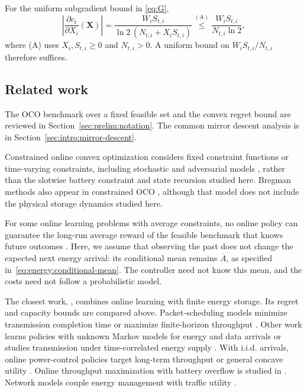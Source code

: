 For the uniform subgradient bound in \eqref{eq:G},
\[
 \left|\frac{\partial c_t}{\partial X_i}(\mathbf X)\right|
 =\frac{W_iS_{t,i}}{\ln 2\,(N_{t,i}+X_iS_{t,i})}
 \overset{\mathrm{(A)}}{\leq}\frac{W_iS_{t,i}}{N_{t,i}\ln 2},
\]
where (A) uses $X_i,S_{t,i}\geq0$ and $N_{t,i}>0$.
A uniform bound on $W_iS_{t,i}/N_{t,i}$ therefore suffices.

\subsection{Related work}

The OCO benchmark over a fixed feasible set and the convex regret bound
are reviewed in Section~\ref{sec:prelim:notation}. The common mirror
descent analysis is in Section~\ref{sec:intro:mirror-descent}.

Constrained online convex optimization considers fixed constraint functions
\cite{mahdavi2012trading,jenatton2016adaptive,titov2018mirror,JMLR:v21:16-494,Yuan2018}
or time-varying constraints, including stochastic and adversarial models
\cite{yu2017online,chen2018bandit,liakopoulos2019cautious}, rather than
the slotwise battery constraint and state recursion studied here.
Bregman methods also appear in constrained OCO \cite{wei2020online}, although that model
does not include the physical storage dynamics studied here.

For some online learning problems with average constraints, no online policy
can guarantee the long-run average reward of the feasible benchmark that
knows future outcomes \cite{mannor2009online}.
Here, we assume that observing the past does not change the expected next
energy arrival: its conditional mean remains $\overline A$, as specified
in~\eqref{eq:energy:conditional-mean}. The controller need not know this mean,
and the costs need not follow a probabilistic model.

The closest work, \cite{Yu2019}, combines online learning with finite
energy storage. Its regret and capacity bounds are compared above.
Packet-scheduling models minimize transmission completion time or maximize
finite-horizon throughput \cite{yang2011optimal,tutuncuoglu2012optimum}.
Other work learns policies with unknown Markov models for energy and data
arrivals \cite{blasco2013learning} or studies transmission under
time-correlated energy supply \cite{michelusi2013transmission}.
With i.i.d. arrivals, online power-control policies target long-term
throughput or general concave utility
\cite{shaviv2016universally,arafa2017energy}.
Online throughput maximization with battery overflow is studied
in \cite{wu2016online}. Network models couple energy management with
traffic utility \cite{Huang2013,leonidas-energy-harvest}.

